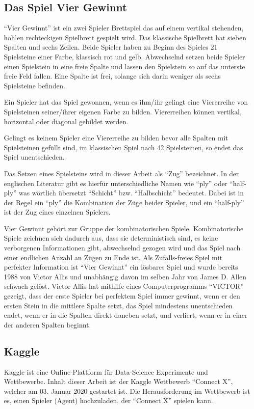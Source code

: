 \subsection{Das Spiel Vier Gewinnt}
“Vier Gewinnt” ist ein zwei Spieler Brettspiel das auf einem vertikal stehenden, hohlen rechteckigen Spielbrett gespielt wird. Das klassische Spielbrett hat sieben Spalten und sechs Zeilen. Beide Spieler haben zu Beginn des Spieles 21 Spielsteine einer Farbe, klassisch rot und gelb. Abwechselnd setzen beide Spieler einen Spielstein in eine freie Spalte und lassen den Spielstein so auf das unterste freie Feld fallen. Eine Spalte ist frei, solange sich darin weniger als sechs Spielsteine befinden.
\par
Ein Spieler hat das Spiel gewonnen, wenn es ihm/ihr gelingt eine Viererreihe von Spielsteinen seiner/ihrer eigenen Farbe zu bilden. Viererreihen können vertikal, horizontal oder diagonal gebildet werden.
\par
Gelingt es keinem Spieler eine Viererreihe zu bilden bevor alle Spalten mit Spielsteinen gefüllt sind, im klassischen Spiel nach 42 Spielsteinen, so endet das Spiel unentschieden.\\
\par
Das Setzen eines Spielsteins wird in dieser Arbeit als “Zug” bezeichnet. In der englischen Literatur gibt es hierfür unterschiedliche Namen wie “ply” oder “half-ply” was wörtlich übersetzt “Schicht” bzw. “Halbschicht” bedeutet. Dabei ist in der Regel ein “ply” die Kombination der Züge beider Spieler, und ein “half-ply” ist der Zug eines einzelnen Spielers.\\
\par
Vier Gewinnt gehört zur Gruppe der kombinatorischen Spiele. Kombinatorische Spiele zeichnen sich dadurch aus, dass sie deterministisch sind, es keine verborgenen Informationen gibt, abwechselnd gezogen wird und das Spiel nach einer endlichen Anzahl an Zügen zu Ende ist. Als Zufalls-freies Spiel mit perfekter Information ist “Vier Gewinnt” ein lösbares Spiel und wurde bereits 1988 von Victor Allis und unabhängig davon im selben Jahr von James D. Allen schwach gelöst. Victor Allis hat mithilfe eines Computerprogramms “VICTOR” gezeigt, dass der erste Spieler bei perfektem Spiel immer gewinnt, wenn er den ersten Stein in die mittlere Spalte setzt, das Spiel mindestens unentschieden endet, wenn er in die Spalten direkt daneben setzt, und verliert, wenn er in einer der anderen Spalten beginnt.


\subsection{Kaggle}
Kaggle ist eine Online-Plattform für Data-Science Experimente und Wettbewerbe. 
Inhalt dieser Arbeit ist der Kaggle Wettbewerb “Connect X”, welcher am 03. Januar 2020 gestartet ist. Die Herausforderung im Wettbewerb ist es, einen Spieler (Agent) hochzuladen, der “Connect X” spielen kann.
